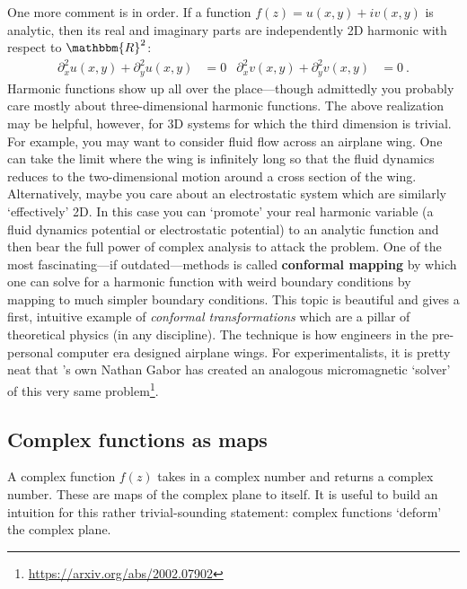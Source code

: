 One more comment is in order. If a function $f(z) = u(x,y)+ i v(x,y)$ is analytic, then its real and imaginary parts are independently 2D harmonic with respect to $\mathbbm{R}^2$:
\begin{align}
	\partial_x^2 u(x,y) + \partial_y^2 u(x,y) &= 0
	&
	\partial_x^2 v(x,y) + \partial_y^2 v(x,y) &= 0 \ .
\end{align}
Harmonic functions show up all over the place---though admittedly you probably care mostly about three-dimensional harmonic functions. The above realization may be helpful, however, for 3D systems for which the third dimension is trivial. For example, you may want to consider fluid flow across an airplane wing. One can take the limit where the wing is infinitely long so that the fluid dynamics reduces to the two-dimensional motion around a cross section of the wing. Alternatively, maybe you care about an electrostatic system which are similarly `effectively' 2D. In this case you can `promote' your real harmonic variable (a fluid dynamics potential or electrostatic potential) to an analytic function and then bear the full power of complex analysis to attack the problem. One of the most fascinating---if outdated---methods is called \textbf{conformal mapping} by which one can solve for a harmonic function with weird boundary conditions by mapping to much simpler boundary conditions. This topic is beautiful and gives a first, intuitive example of \emph{conformal transformations} which are a pillar of theoretical physics (in any discipline). The technique is how engineers in the pre-personal computer era designed airplane wings. For experimentalists, it is pretty neat that 's own Nathan Gabor has created an analogous micromagnetic `solver' of this very same problem\footnote{\url{https://arxiv.org/abs/2002.07902}}.

\subsection{Complex functions as maps}

A complex function $f(z)$ takes in a complex number and returns a complex number. These are maps of the complex plane to itself. It is useful to build an intuition for this rather trivial-sounding statement: complex functions `deform' the complex plane. 

